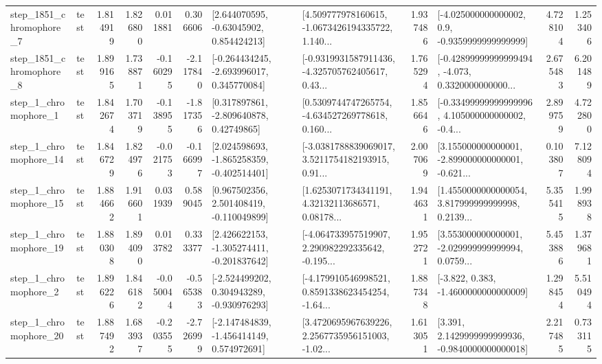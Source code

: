 \begin{tabular}{llrrrrllrlrr}
  step\_1851\_chromophore\_7 &      test &      1.814919 &    1.826800 &      0.011881 &  0.306606 &     [2.644070595, -0.63045902, 0.854424213] &  [4.509777978160615, -1.0673426194335722, 1.140... &       1.937486 &     [-4.025000000000002, 0.9, -0.9359999999999999] &            4.728104 &          1.253406 \\
  step\_1851\_chromophore\_8 &      test &      1.899165 &    1.738871 &     -0.160295 & -2.117840 &   [-0.264434245, -2.693996017, 0.345770084] &  [-0.9319931587911436, -4.325705762405617, 0.43... &       1.765294 &  [-0.42899999999999494, -4.073, 0.3320000000000... &            2.675483 &          6.201489 \\
     step\_1\_chromophore\_1 &      test &      1.842674 &    1.703719 &     -0.138955 & -1.817356 &     [0.317897861, -2.809640878, 0.42749865] &  [0.5309744747265754, -4.634527269778618, 0.160... &       1.856646 &  [-0.33499999999999996, 4.105000000000002, -0.4... &            2.899759 &          4.722800 \\
    step\_1\_chromophore\_14 &      test &      1.846729 &    1.824976 &     -0.021753 & -0.166997 &   [2.024598693, -1.865258359, -0.402514401] &  [-3.0381788839069017, 3.5211754182193915, 0.91... &       2.007069 &  [3.155000000000001, -2.899000000000001, -0.621... &            0.103807 &          7.128094 \\
    step\_1\_chromophore\_15 &      test &      1.884662 &    1.916601 &      0.031939 &  0.589045 &    [0.967502356, 2.501408419, -0.110049899] &  [1.6253071734341191, 4.32132113686571, 0.08178... &       1.944631 &  [1.4550000000000054, 3.817999999999998, 0.2139... &            5.355415 &          1.998938 \\
    step\_1\_chromophore\_19 &      test &      1.880308 &    1.894090 &      0.013782 &  0.333377 &   [2.426622153, -1.305274411, -0.201837642] &  [-4.064733957519907, 2.290982292335642, -0.195... &       1.952721 &  [3.553000000000001, -2.029999999999994, 0.0759... &            5.453886 &          1.379681 \\
     step\_1\_chromophore\_2 &      test &      1.896226 &    1.846182 &     -0.050044 & -0.565383 &   [-2.524499202, 0.304943289, -0.930976293] &  [-4.179910546998521, 0.8591338623454254, -1.64... &       1.887348 &               [-3.822, 0.383, -1.4600000000000009] &            1.298454 &          5.510494 \\
    step\_1\_chromophore\_20 &      test &      1.887492 &    1.683937 &     -0.203555 & -2.726999 &   [-2.147484839, -1.456414149, 0.574972691] &  [3.4720695967639226, 2.2567735956151003, -1.02... &       1.613051 &   [3.391, 2.1429999999999936, -0.9840000000000018] &            2.217485 &          0.733115 \\

\end{tabular}
